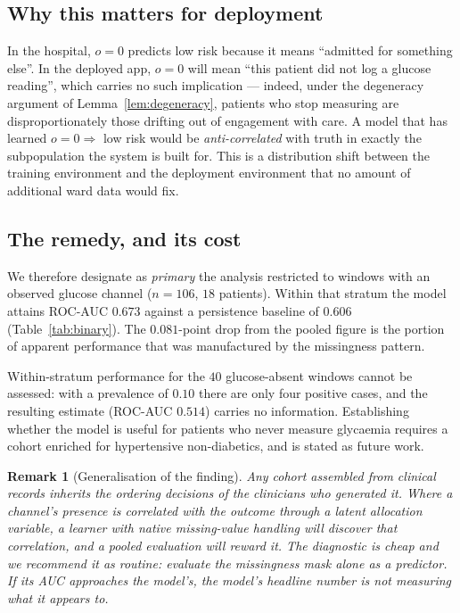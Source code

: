 \documentclass[11pt,a4paper]{article}
\newtheorem{remark}{Remark}
\begin{document}
\subsection{Why this matters for deployment}

In the hospital, $o=0$ predicts low risk because it means ``admitted for something
else''. In the deployed app, $o=0$ will mean ``this patient did not log a glucose
reading'', which carries no such implication --- indeed, under the degeneracy
argument of Lemma~\ref{lem:degeneracy}, patients who stop measuring are
disproportionately those drifting out of engagement with care. A model that has
learned $o=0 \Rightarrow$ low risk would be \emph{anti-correlated} with truth in
exactly the subpopulation the system is built for. This is a distribution shift
between the training environment and the deployment environment that no amount of
additional ward data would fix.

\subsection{The remedy, and its cost}

We therefore designate as \emph{primary} the analysis restricted to windows with an
observed glucose channel ($n=106$, $18$ patients). Within that stratum the model
attains ROC-AUC $0.673$ against a persistence baseline of $0.606$
(Table~\ref{tab:binary}). The $0.081$-point drop from the pooled figure is the
portion of apparent performance that was manufactured by the missingness pattern.

Within-stratum performance for the $40$ glucose-absent windows cannot be assessed:
with a prevalence of $0.10$ there are only four positive cases, and the resulting
estimate (ROC-AUC $0.514$) carries no information. Establishing whether the model
is useful for patients who never measure glycaemia requires a cohort enriched for
hypertensive non-diabetics, and is stated as future work.

\begin{remark}[Generalisation of the finding]
Any cohort assembled from clinical records inherits the ordering decisions of the
clinicians who generated it. Where a channel's presence is correlated with the
outcome through a latent allocation variable, a learner with native missing-value
handling will discover that correlation, and a pooled evaluation will reward it.
The diagnostic is cheap and we recommend it as routine: \emph{evaluate the
missingness mask alone as a predictor}. If its AUC approaches the model's, the
model's headline number is not measuring what it appears to.
\end{remark}
\end{document}
